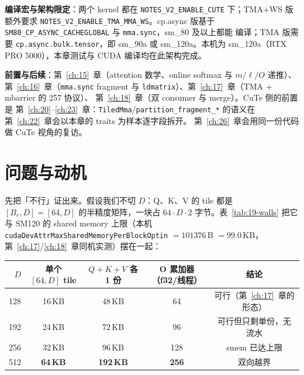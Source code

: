 \textbf{编译宏与架构限定}：两个 kernel 都在
\texttt{NOTES\_V2\_}\allowbreak\texttt{ENABLE\_}\allowbreak\texttt{CUTE} 下；TMA+WS 版额外要求
\texttt{NOTES\_V2\_}\allowbreak\texttt{ENABLE\_}\allowbreak\texttt{TMA\_}\allowbreak\texttt{MMA\_WS}。cp.async 版基于
\texttt{SM80\_CP\_}\allowbreak\texttt{ASYNC\_}\allowbreak\texttt{CACHEGLOBAL} 与 \texttt{mma.sync}，sm\_80 及以上都能
编译；TMA 版需要 \texttt{cp.async.}\allowbreak\texttt{bulk.}\allowbreak\texttt{tensor}，即 sm\_90a 或 sm\_120a。本机为
sm\_120a（RTX PRO 5000），本章测试与 CUDA 编译均在此架构完成。

\textbf{前置与后续}：第~\ref{ch:15}~章（attention 数学、online softmax 与
$m/\ell/O$ 递推）、第~\ref{ch:16}~章（\texttt{mma.sync} fragment 与
\texttt{ldmatrix}）、第~\ref{ch:17}~章（TMA + mbarrier 的 257 协议）、
第~\ref{ch:18}~章（双 consumer 与 merge）。CuTe 侧的前置是
第~\ref{ch:20}--\ref{ch:23}~章：\texttt{TiledMma}/\texttt{partition\_\allowbreak{}fragment\_\allowbreak{}*}
的语义在第~\ref{ch:22}~章会以本章的 traits 为样本逐字段拆开。
第~\ref{ch:26}~章会用同一份代码做 CuTe 视角的复访。

\section{问题与动机}

先把「不行」证出来。假设我们不切 $D$：Q、K、V 的 tile 都是
$[B_r, D] = [64, D]$ 的半精度矩阵，一块占 $64 \cdot D \cdot 2$ 字节。表~\ref{tab:19-walls}
把它与 SM120 的 shared memory 上限（本机
\texttt{cuda\allowbreak{}Dev\allowbreak{}Attr\allowbreak{}Max\allowbreak{}Shared\allowbreak{}Memory\allowbreak{}Per\allowbreak{}Block\allowbreak{}Optin} $= 101376$\,B $= 99.0$\,KB，
第~\ref{ch:17}/\ref{ch:18}~章同机实测）摆在一起：

\begin{center}
\begin{tabular}{rcccc}
\toprule
$D$ & 单个 $[64,D]$ tile & $Q{+}K{+}V$ 各 1 份 & O 累加器（f32/线程） & 结论 \\
\midrule
128 & 16\,KB & 48\,KB & 64 & 可行（第~\ref{ch:17}~章的形态） \\
192 & 24\,KB & 72\,KB & 96 & 可行但只剩单份，无流水 \\
256 & 32\,KB & 96\,KB & 128 & smem 已达上限 \\
512 & \textbf{64\,KB} & \textbf{192\,KB} & \textbf{256} & 双向越界 \\
\bottomrule
\end{tabular}
\label{tab:19-walls}
\end{center}

